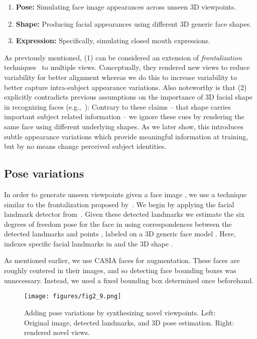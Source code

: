 \documentclass[runningheads]{llncs}
\begin{document}
\begin{enumerate}
\item {\bf Pose:} Simulating face image appearances across unseen 3D viewpoints.
\item {\bf Shape:} Producing facial appearances using different 3D generic face shapes.
\item {\bf Expression:} Specifically, simulating closed mouth expressions.
\end{enumerate}
As previously mentioned, (1) can be considered an extension of {\em frontalization} techniques~\cite{hassner2015effective} to multiple views. Conceptually, they rendered new views to reduce variability for better alignment whereas we do this to increase variability to better capture intra-subject appearance variations. Also noteworthy is that (2) explicitly contradicts previous assumptions on the importance of 3D facial shape in recognizing faces (e.g.,~\cite{taigman2014deepface}): Contrary to these claims -- that shape carries important subject related information -- we ignore these cues by rendering the same face using different underlying shapes. As we later show, this introduces subtle appearance variations which provide meaningful information at training, but by no means change perceived subject identities.

\subsection{Pose variations}\label{sec:pose}
In order to generate unseen viewpoints given a face image , we use a technique similar to the frontalization proposed by~\cite{hassner2015effective}. We begin by applying the facial landmark detector from~\cite{lp:landmark}. Given these detected landmarks we estimate the six degrees of freedom pose for the face in  using correspondences between the detected landmarks  and points , labeled on a 3D generic face model . Here,  indexes specific facial landmarks in  and the 3D shape . 

As mentioned earlier, we use CASIA faces for augmentation. These faces are roughly centered in their images, and so detecting face bounding boxes was unnecessary. Instead, we used a fixed bounding box determined once beforehand.


\begin{figure}[t]
\centering
\texttt{[image: figures/fig2\_9.png]}
\caption{Adding pose variations by synthesizing novel viewpoints. Left: Original image, detected landmarks, and 3D pose estimation. Right: rendered novel views.}
\label{fig:poses}
\vspace{-3mm}
\end{figure}
\end{document}
